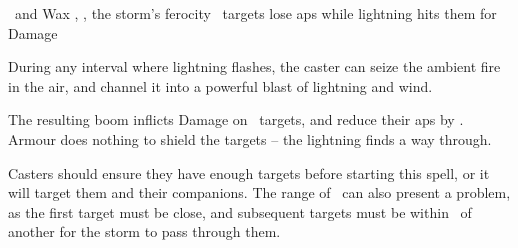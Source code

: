   {\mAir\ and \mFire}%
  {Wax}%
  {\detailed, \divergent, \duplicated}%
  {the storm's ferocity}%
  {\spellArea\ targets lose  \glspl{ap} while lightning hits them for  Damage}%
  {
    During any \gls{interval} where lightning flashes, the caster can seize the ambient fire in the air, and channel it into a powerful blast of lightning and wind.

    The resulting boom inflicts  Damage on \spellArea\ targets, and reduce their \glspl{ap} by .
    Armour does nothing to shield the targets -- the lightning finds a way through.

    Casters should ensure they have enough targets before starting this spell, or it will target them and their companions.
    The range of \spellRange\ can also present a problem, as the first target must be close, and subsequent targets must be within \spellRange\ of another for the storm to pass through them.
  }

